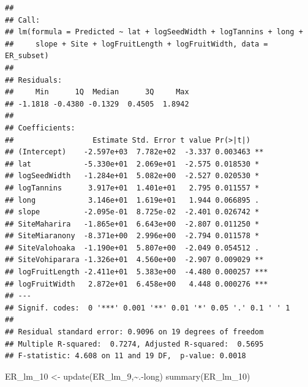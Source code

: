 \documentclass[
  12pt,
]{article}
\newenvironment{Shaded}{\begin{snugshade}}{\end{snugshade}}
\newcommand{\FunctionTok}[1]{\textcolor[rgb]{0.00,0.00,0.00}{#1}}
\newcommand{\NormalTok}[1]{#1}
\newcommand{\OtherTok}[1]{\textcolor[rgb]{0.56,0.35,0.01}{#1}}
\newcommand{\SpecialCharTok}[1]{\textcolor[rgb]{0.00,0.00,0.00}{#1}}
\begin{document}
\begin{verbatim}
## 
## Call:
## lm(formula = Predicted ~ lat + logSeedWidth + logTannins + long + 
##     slope + Site + logFruitLength + logFruitWidth, data = ER_subset)
## 
## Residuals:
##     Min      1Q  Median      3Q     Max 
## -1.1818 -0.4380 -0.1329  0.4505  1.8942 
## 
## Coefficients:
##                  Estimate Std. Error t value Pr(>|t|)    
## (Intercept)    -2.597e+03  7.782e+02  -3.337 0.003463 ** 
## lat            -5.330e+01  2.069e+01  -2.575 0.018530 *  
## logSeedWidth   -1.284e+01  5.082e+00  -2.527 0.020530 *  
## logTannins      3.917e+01  1.401e+01   2.795 0.011557 *  
## long            3.146e+01  1.619e+01   1.944 0.066895 .  
## slope          -2.095e-01  8.725e-02  -2.401 0.026742 *  
## SiteMaharira   -1.865e+01  6.643e+00  -2.807 0.011250 *  
## SiteMiaranony  -8.371e+00  2.996e+00  -2.794 0.011578 *  
## SiteValohoaka  -1.190e+01  5.807e+00  -2.049 0.054512 .  
## SiteVohiparara -1.326e+01  4.560e+00  -2.907 0.009029 ** 
## logFruitLength -2.411e+01  5.383e+00  -4.480 0.000257 ***
## logFruitWidth   2.872e+01  6.458e+00   4.448 0.000276 ***
## ---
## Signif. codes:  0 '***' 0.001 '**' 0.01 '*' 0.05 '.' 0.1 ' ' 1
## 
## Residual standard error: 0.9096 on 19 degrees of freedom
## Multiple R-squared:  0.7274, Adjusted R-squared:  0.5695 
## F-statistic: 4.608 on 11 and 19 DF,  p-value: 0.0018
\end{verbatim}

\begin{Shaded}
\begin{Highlighting}[]
\NormalTok{ER\_lm\_10 }\OtherTok{\textless{}{-}} \FunctionTok{update}\NormalTok{(ER\_lm\_9,}\SpecialCharTok{\textasciitilde{}}\NormalTok{.}\SpecialCharTok{{-}}\NormalTok{long)}
\FunctionTok{summary}\NormalTok{(ER\_lm\_10)}
\end{Highlighting}
\end{Shaded}
\end{document}
